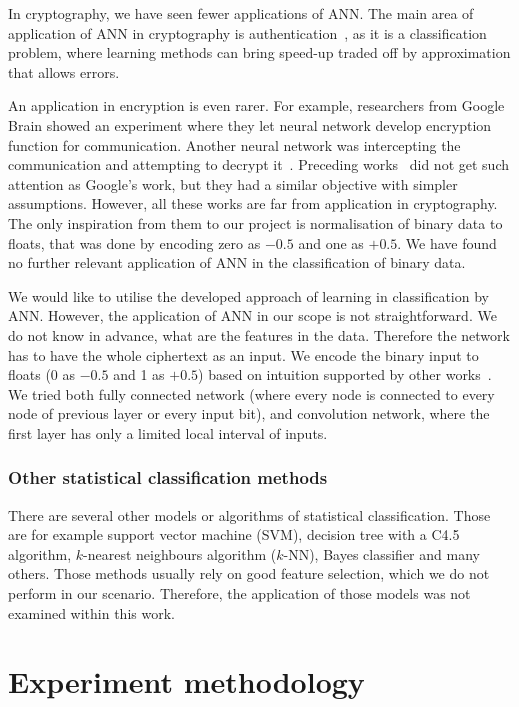 \documentclass[
    digital,    %
    oneside,    %
    color,
    11pt,
    nocover,
    notable,
    nolof,
    nolot,
]{fithesis3}
\begin{document}
In cryptography, we have seen fewer applications of ANN. The main area of application of ANN in cryptography is authentication~\cite{li2001remote}, as it is a classification problem, where learning methods can bring speed-up traded off by approximation that allows errors.

An application in encryption is even rarer. For example, researchers from Google Brain showed an experiment where they let neural network develop encryption function for communication. Another neural network was intercepting the communication and attempting to decrypt it~\cite{abadi2016learning}. Preceding works~\cite{shihab2006backpropagation, volna2012cryptography} did not get such attention as Google's work, but they had a similar objective with simpler assumptions. However, all these works are far from application in cryptography. The only inspiration from them to our project is normalisation of binary data to floats, that was done by encoding zero as $-0.5$ and one as $+0.5$. We have found no further relevant application of ANN in the classification of binary data.

We would like to utilise the developed approach of learning in classification by ANN. However, the application of ANN in our scope is not straightforward. We do not know in advance, what are the features in the data. Therefore the network has to have the whole ciphertext as an input. We encode the binary input to floats (0 as $-0.5$ and 1 as $+0.5$) based on intuition supported by other works~\cite{abadi2016learning,shihab2006backpropagation}. We tried both fully connected network (where every node is connected to every node of previous layer or every input bit), and convolution network, where the first layer has only a limited local interval of inputs. 


\subsection{Other statistical classification methods}

There are several other models or algorithms of statistical classification. Those are for example support vector machine (SVM), decision tree with a C4.5 algorithm, $k$-nearest neighbours algorithm ($k$-NN), Bayes classifier and many others. Those methods usually rely on good feature selection, which we do not perform in our scenario. Therefore, the application of those models was not examined within this work.


\chapter{Experiment methodology}
\label{chap:method}
\end{document}
